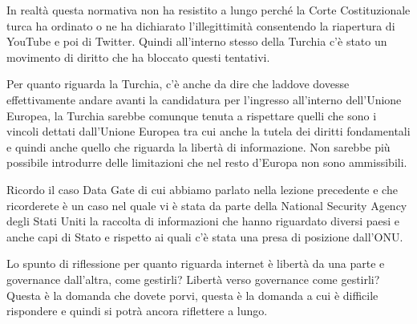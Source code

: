 In realtà questa normativa non ha resistito a lungo perché la Corte Costituzionale turca ha ordinato o ne ha dichiarato l'illegittimità consentendo la riapertura di YouTube e poi di Twitter. Quindi all'interno stesso della Turchia c'è stato un movimento di diritto che ha bloccato questi tentativi.\par
Per quanto riguarda la Turchia, c'è anche da dire che laddove dovesse effettivamente andare avanti la candidatura per l'ingresso all'interno dell'Unione Europea, la Turchia sarebbe comunque tenuta a rispettare quelli che sono i vincoli dettati dall'Unione Europea tra cui anche la tutela dei diritti fondamentali e quindi anche quello che riguarda la libertà di informazione. Non sarebbe più possibile introdurre delle limitazioni che nel resto d'Europa non sono ammissibili.\par
Ricordo il caso Data Gate di cui abbiamo parlato nella lezione precedente e che ricorderete è un caso nel quale vi è stata da parte della National Security Agency degli Stati Uniti la raccolta di informazioni che hanno riguardato diversi paesi e anche capi di Stato e rispetto ai quali c'è stata una presa di posizione dall'ONU.\par
Lo spunto di riflessione per quanto riguarda internet è libertà da una parte e governance dall'altra, come gestirli? Libertà verso governance come gestirli? Questa è la domanda che dovete porvi, questa è la domanda a cui è difficile rispondere e quindi si potrà ancora riflettere a lungo.